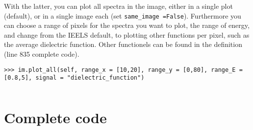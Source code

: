 \documentclass{article}
\begin{document}
With the latter, you can plot all spectra in the image, either in a single plot (default), or in a single image each (set \verb|same_image =False|). Furthermore you can choose a range of pixels for the spectra you want to plot, the range of energy, and change from the IEELS default, to plotting other functions per pixel, such as the average dielectric function. Other functionels can be found in the definition (line 835 complete code).
\begin{lstlisting}
>>> im.plot_all(self, range_x = [10,20], range_y = [0,80], range_E = [0.8,5], signal = "dielectric_function")
\end{lstlisting}


\newpage
\begin{adjustwidth}{-20mm}{-25mm}
\lstset{numbers=left, firstnumber=1
}%
\begin{lstlisting}[numbers=left, firstnumber=1]
\end{lstlisting}

\section{Complete code}

\end{adjustwidth}
\end{document}
